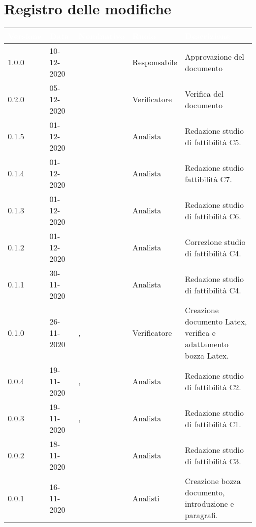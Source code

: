 \section*{Registro delle modifiche}
{
\renewcommand{\arraystretch}{1.5}
\centering
\begin{longtable}{C{1.7cm} C{2.5cm} C{3.2cm} C{2.7cm} C{4.8cm}}
\textcolor{white}{\textbf{Versione}}&
\textcolor{white}{\textbf{Data}}&
\textcolor{white}{\textbf{Nominativo}}&
\textcolor{white}{\textbf{Ruolo}}&
\textcolor{white}{\textbf{Descrizione}}\\	
\endhead

1.0.0 & 10-12-2020 & \SG{} & Responsabile & Approvazione del documento\\  
0.2.0 & 05-12-2020 & \BM{} & Verificatore & Verifica del documento\\
0.1.5 & 01-12-2020 & \SH{} & Analista & Redazione studio di fattibilità C5.\\
0.1.4 & 01-12-2020 & \PA{} & Analista & Redazione studio fattibilità C7.\\
0.1.3 & 01-12-2020 & \RA{} & Analista & Redazione studio di fattibilità C6.\\
0.1.2 & 01-12-2020 & \ZM{} & Analista & Correzione studio di fattibilità C4.\\
0.1.1 & 30-11-2020 & \ZM{} & Analista & Redazione studio di fattibilità C4.\\
0.1.0 & 26-11-2020 & \SG{}, \BM{} & Verificatore & Creazione documento Latex, verifica e adattamento bozza Latex. \\
0.0.4 & 19-11-2020 & \ZM{}, \SP{} & Analista & Redazione studio di fattibilità C2.\\
0.0.3 & 19-11-2020 & \ZM{}, \SP{} & Analista & Redazione studio di fattibilità C1.\\		
0.0.2 & 18-11-2020 & \PA{} & Analista & Redazione studio di fattibilità C3.\\
0.0.1 & 16-11-2020 & \Gruppo{} & Analisti & Creazione bozza documento, introduzione e paragrafi. \\	
\end{longtable}
}
